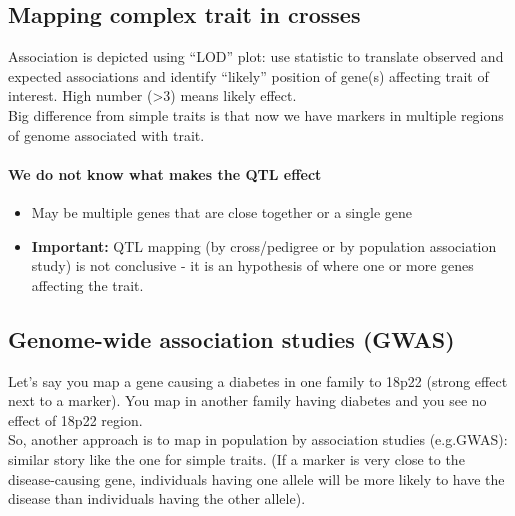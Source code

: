 \documentclass{scrartcl}
\begin{document}
\subsection{Mapping complex trait in crosses}
\label{sec:4-5}
Association is depicted using ``LOD'' plot: use statistic to translate observed and expected associations and identify ``likely'' position of gene(s) affecting trait of interest.
High number (>3) means likely effect.\\
Big difference from simple traits is that now we have markers in multiple regions of genome associated with trait.

\paragraph{We do not know what makes the QTL effect}
\begin{itemize}
\item May be multiple genes that are close together or a single gene
\item {\bf Important:} QTL mapping (by cross/pedigree or by population association study) is not conclusive - it is an hypothesis of where one or more genes affecting the trait.
\end{itemize}

\subsection{Genome-wide association studies (GWAS)}
\label{sec:4-6}
Let's say you map a gene causing a diabetes in one family to 18p22 (strong effect next to a marker).
You map in another family having diabetes and you see no effect of 18p22 region.\\
So, another approach is to map in population by association studies (e.g.GWAS): similar story like the one for simple traits.
(If a marker is very close to the disease-causing gene, individuals having one allele will be more likely to have the disease than individuals having the other allele).
\end{document}
